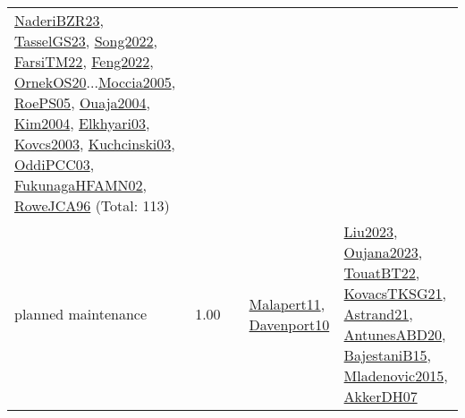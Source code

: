 {\begin{longtable}{p{3cm}r>{\raggedright\arraybackslash}p{6cm}>{\raggedright\arraybackslash}p{6cm}>{\raggedright\arraybackslash}p{8cm}}
\hyperref[detail:NaderiBZR23]{NaderiBZR23}, \hyperref[detail:TasselGS23]{TasselGS23}, \hyperref[detail:Song2022]{Song2022}, \hyperref[detail:FarsiTM22]{FarsiTM22}, \hyperref[detail:Feng2022]{Feng2022}, \hyperref[detail:OrnekOS20]{OrnekOS20}...\hyperref[detail:Moccia2005]{Moccia2005}, \hyperref[detail:RoePS05]{RoePS05}, \hyperref[detail:Ouaja2004]{Ouaja2004}, \hyperref[detail:Kim2004]{Kim2004}, \hyperref[detail:Elkhyari03]{Elkhyari03}, \hyperref[detail:Kovcs2003]{Kovcs2003}, \hyperref[detail:Kuchcinski03]{Kuchcinski03}, \hyperref[detail:OddiPCC03]{OddiPCC03}, \hyperref[detail:FukunagaHFAMN02]{FukunagaHFAMN02}, \hyperref[detail:RoweJCA96]{RoweJCA96} (Total: 113)\\
\index{planned maintenance}\index{Concepts!planned maintenance}planned maintenance &  1.00 &  & \hyperref[detail:Malapert11]{Malapert11}, \hyperref[detail:Davenport10]{Davenport10} & \hyperref[detail:Liu2023]{Liu2023}, \hyperref[detail:Oujana2023]{Oujana2023}, \hyperref[detail:TouatBT22]{TouatBT22}, \hyperref[detail:KovacsTKSG21]{KovacsTKSG21}, \hyperref[detail:Astrand21]{Astrand21}, \hyperref[detail:AntunesABD20]{AntunesABD20}, \hyperref[detail:BajestaniB15]{BajestaniB15}, \hyperref[detail:Mladenovic2015]{Mladenovic2015}, \hyperref[detail:AkkerDH07]{AkkerDH07}\\

\end{longtable}}
